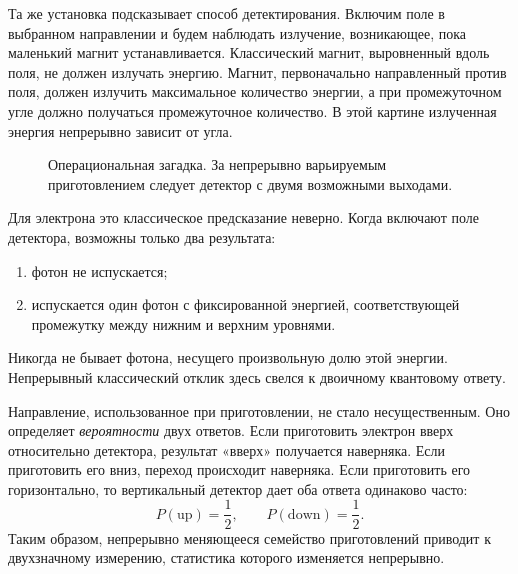Та же установка подсказывает способ детектирования. Включим поле в выбранном направлении и будем наблюдать излучение, возникающее, пока маленький магнит устанавливается. Классический магнит, выровненный вдоль поля, не должен излучать энергию. Магнит, первоначально направленный против поля, должен излучить максимальное количество энергии, а при промежуточном угле должно получаться промежуточное количество. В этой картине излученная энергия непрерывно зависит от угла.

\begin{figure}[htbp]
\centering
\begin{coursefitfigure}
\end{coursefitfigure}
\caption{Операциональная загадка. За непрерывно варьируемым приготовлением следует детектор с двумя возможными выходами.}
\end{figure}

Для электрона это классическое предсказание неверно. Когда включают поле детектора, возможны только два результата:
\begin{enumerate}
  \item фотон не испускается;
  \item испускается один фотон с фиксированной энергией, соответствующей промежутку между нижним и верхним уровнями.
\end{enumerate}
Никогда не бывает фотона, несущего произвольную долю этой энергии. Непрерывный классический отклик здесь свелся к двоичному квантовому ответу.

Направление, использованное при приготовлении, не стало несущественным. Оно определяет \emph{вероятности} двух ответов. Если приготовить электрон вверх относительно детектора, результат «вверх» получается наверняка. Если приготовить его вниз, переход происходит наверняка. Если приготовить его горизонтально, то вертикальный детектор дает оба ответа одинаково часто:
\begin{equation}
  P(\text{up})=\frac12,
  \qquad
  P(\text{down})=\frac12.
  \label{eq:l02-horizontal-probabilities}
\end{equation}
Таким образом, непрерывно меняющееся семейство приготовлений приводит к двухзначному измерению, статистика которого изменяется непрерывно.

